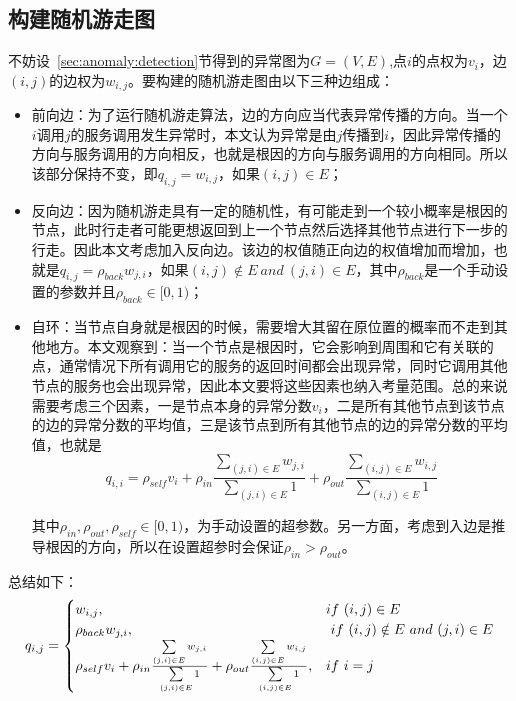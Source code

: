 \subsection{构建随机游走图}
不妨设~\ref{sec:anomaly:detection}节得到的异常图为$G=(V,E)$,点$i$的点权为$v_i$，边$(i,j)$的边权为$w_{i,j}$。要构建的随机游走图由以下三种边组成：
\begin{itemize}
  \item 前向边：为了运行随机游走算法，边的方向应当代表异常传播的方向。当一个$i$调用$j$的服务调用发生异常时，本文认为异常是由$j$传播到$i$，因此异常传播的方向与服务调用的方向相反，也就是根因的方向与服务调用的方向相同。所以该部分保持不变，即$q_{i,j} = w_{i,j}$，如果$(i,j) \in E$；
  \item 反向边：因为随机游走具有一定的随机性，有可能走到一个较小概率是根因的节点，此时行走者可能更想返回到上一个节点然后选择其他节点进行下一步的行走。因此本文考虑加入反向边。该边的权值随正向边的权值增加而增加，也就是$q_{i,j} = \rho_{back} w_{j,i}$，如果$(i,j) \notin E\ and\  (j,i) \in E$，其中$\rho_{back}$是一个手动设置的参数并且$\rho_{back} \in [0,1)$；
  \item 自环：当节点自身就是根因的时候，需要增大其留在原位置的概率而不走到其他地方。本文观察到：当一个节点是根因时，它会影响到周围和它有关联的点，通常情况下所有调用它的服务的返回时间都会出现异常，同时它调用其他节点的服务也会出现异常，因此本文要将这些因素也纳入考量范围。总的来说需要考虑三个因素，一是节点本身的异常分数$v_i$，二是所有其他节点到该节点的边的异常分数的平均值，三是该节点到所有其他节点的边的异常分数的平均值，也就是
  \begin{equation*}
    q_{i,i} = \rho_{self} v_i + \rho_{in} \frac{\sum\limits_{(j,i) \in E}{w_{j,i}}}{\sum\limits_{(j,i) \in E}1} + \rho_{out} \frac{\sum\limits_{(i,j) \in E}{w_{i,j}}}{\sum\limits_{(i,j) \in E}1}
  \end{equation*}

  其中$\rho_{in},\rho_{out},\rho_{self}\in [0,1)$，为手动设置的超参数。另一方面，考虑到入边是推导根因的方向，所以在设置超参时会保证$\rho_{in}>\rho_{out}$。
\end{itemize}

总结如下：
\begin{equation*}
q_{i,j} = \begin{cases} w_{i,j}, & if\ (i,j) \in E \cr \rho_{back} w_{j,i}, &\ if\ (i,j) \notin E\ and\  (j,i) \in E \cr \rho_{self} v_i + \rho_{in} \frac{\sum\limits_{(j,i) \in E}{w_{j,i}}}{\sum\limits_{(j,i) \in E}1} + \rho_{out} \frac{\sum\limits_{(i,j) \in E}{w_{i,j}}}{\sum\limits_{(i,j) \in E}1}, & if\ i=j \end{cases}
\end{equation*}

